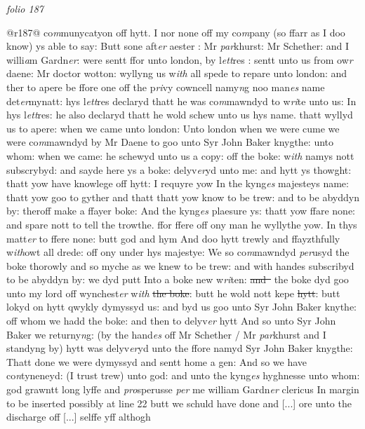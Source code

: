 \documentclass[12pt, a4paper]{book}
\begin{document}
\dotfill
					

\textit{folio 187}
            		
            		
            		@r187@ co\textit{m}munycatyon off hytt. I nor none off my co\textit{m}pany (so ffarr as I doo know)  ys able to say: Butt sone aft\textit{er} aester : Mr \textit{par}khurst: Mr Schether: and I  willi\textit{a}m Gardn\textit{er}: were sentt ffor unto london, by l\textit{ett}res : sentt unto us from ow\textit{r} daene: Mr doctor wotton: wyllyng us w\textit{ith} all spede to repare unto london: and ther to apere be ffore one off the p\textit{ri}vy cowncell namy\textit{n}g noo man\textit{es} name det\textit{er}mynatt: hys l\textit{ett}res declaryd thatt he was co\textit{m}mawndyd to w\textit{ri}te unto us: In hys l\textit{ett}res: he also declaryd thatt he wold schew unto us hys name. thatt wyllyd us to apere: when we came unto london: Unto london when we were cume we were co\textit{m}mawndyd by Mr Daene to goo unto Syr John Baker knygthe: unto whom: when we came: he schewyd unto us a copy: off the boke: w\textit{ith} namys nott subscrybyd: and sayde here ys a boke: delyv\textit{er}yd unto me: and hytt ys thowght: thatt yow have knowlege off hytt: I requyre yow In the kyng\textit{es} majesteys name: thatt yow goo to gyther and thatt thatt yow know to be trew: and to be abyddyn by: theroff make a ffayer boke: And the kyng\textit{es} plaesure ys: thatt yow ffare none: and spare nott to tell the trowthe. ffor ffere off ony man he wyllythe yow. In thys matt\textit{er} to ffere none: butt god and hym And doo hytt trewly and ffayzthfully w\textit{ith}owt all drede: off ony under hys majestye: We so co\textit{m}mawndyd \textit{per}usyd the boke thorowly and so myche as we knew to be trew: and with handes subscribyd 
			to be abyddyn by: we dyd putt Into a boke new w\textit{ri}ten: \sout{and }
            		the boke 
			dyd goo unto my lord off wynchest\textit{er} w\textit{ith}
            		\sout{the boke}: butt he wold nott kepe \sout{hytt}: butt lokyd on hytt
			 qwykly dymyssyd us:  and byd us goo unto Syr John Baker knythe: off whom we hadd the boke: and then to delyv\textit{er} hytt
			 And so unto Syr John Baker we returny\textit{n}g: (by the hand\textit{es} off Mr Schether / Mr \textit{par}khurst and I standyng by) hytt was delyv\textit{er}yd unto the ffore namyd Syr John Baker knygthe: Thatt done we were dymyssyd and sentt home a gen: And so we have co\textit{n}tyneneyd: (I trust trew) unto god: and unto the kyng\textit{es} hyghnesse unto whom: god grawntt long lyffe and \textit{pro}sperusse \textit{per }me william Gardn\textit{er} clericus  In margin to be inserted possibly at line 22 butt we schuld have done and   
				[...]
			ore unto the   discharge off 
				[...]
			 selffe yff althogh 
            			
\end{document}
